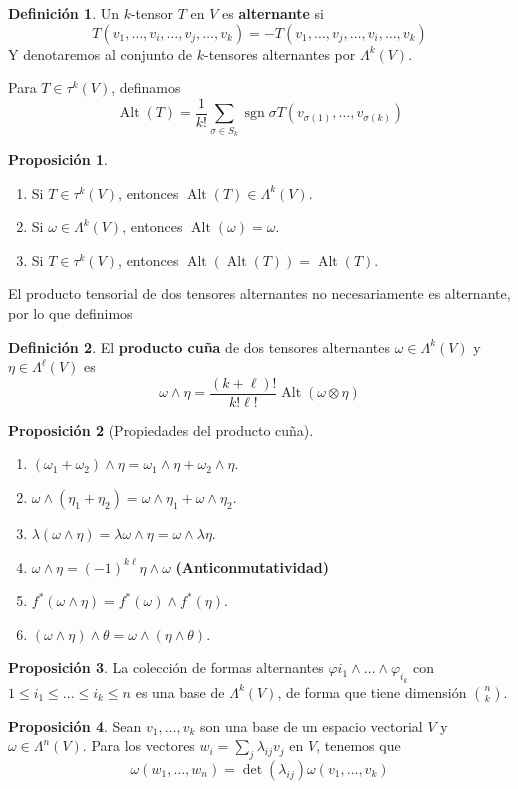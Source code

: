 \documentclass[spanish]{book}
\theoremstyle{definition}
\newtheorem*{defn}{Definición}
\newtheorem*{prop}{Proposición}
\DeclareMathOperator{\Alt}{Alt}
\DeclareMathOperator{\sgn}{sgn}
\begin{document}
	\begin{defn}
		Un $k$-tensor $T$ en $V$ es \textbf{alternante} si
		\[T(v_1,\ldots,v_i,\ldots,v_j,\ldots,v_k)=-T(v_1,\ldots,v_j,\ldots,v_i,\ldots,v_k)\]
		Y denotaremos al conjunto de $k$-tensores alternantes por $\Lambda^k(V)$.
	\end{defn}
	Para $T\in\tau^k(V)$, definamos
	\[	\Alt(T)=\frac{1}{k!}\sum_{\sigma\in S_k}\sgn\sigma T(v_{\sigma(1)},\ldots,v_{\sigma(k)})\]
	\begin{prop}\leavevmode
		\begin{enumerate}
			\item Si $T\in\tau^k(V)$, entonces $\Alt(T)\in\Lambda^k(V)$.
			\item Si $\omega\in\Lambda^k(V)$, entonces $\Alt(\omega)=\omega$.
			\item  Si $T\in\tau^k(V)$, entonces $\Alt(\Alt(T))=\Alt(T)$.
		\end{enumerate}
	\end{prop}
	El producto tensorial de dos tensores alternantes no necesariamente es alternante, por lo que definimos
	\begin{defn}
		El \textbf{producto cuña} de dos tensores alternantes $\omega\in\Lambda^k(V)$ y $\eta\in\Lambda^\ell(V)$ es 
		\[\omega\wedge\eta=\frac{(k+\ell)!}{k!\ell!}\Alt(\omega\otimes\eta)\]
	\end{defn}
	\begin{prop}[Propiedades del producto cuña]\leavevmode
		\begin{enumerate}
			\item $(\omega_1+\omega_2)\wedge\eta=\omega_1\wedge\eta+\omega_2\wedge\eta$.
			\item $\omega\wedge(\eta_1+\eta_2)=\omega\wedge\eta_1+\omega\wedge\eta_2$.
			\item $\lambda(\omega\wedge\eta)=\lambda\omega\wedge\eta=\omega\wedge\lambda\eta$.
			\item $\omega\wedge\eta=(-1)^{k\ell}\eta\wedge\omega$ \textbf{(Anticonmutatividad)}
			\item $f^*(\omega\wedge\eta)=f^*(\omega)\wedge f^*(\eta)$.
			\item $(\omega\wedge\eta)\wedge\theta=\omega\wedge(\eta\wedge\theta)$.
		\end{enumerate}
	\end{prop}
	\begin{prop}
		La colección de formas alternantes $\varphi {i_1}\wedge\ldots\wedge\varphi_{i_k}$ con $1\leq i_1\leq\ldots\leq i_k\leq n$ es una base de $\Lambda^k(V)$, de forma que tiene dimensión $\binom{n}{k}$.
	\end{prop}
	\begin{prop}
		Sean $v_1,\ldots,v_k$ son una base de un espacio vectorial $V$ y $\omega\in\Lambda^n(V)$. Para los vectores $w_i=\sum_j\lambda_{ij}v_j$ en $V$, tenemos que
		\[\omega(w_1,\ldots,w_n)=\det(\lambda_{ij})\omega(v_1,\ldots,v_k)\]
	\end{prop}
	
\end{document}
